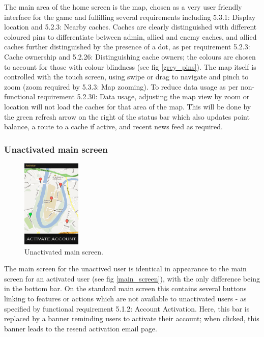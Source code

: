 The main area of the home screen is the map, chosen as a very user friendly interface for the game and fulfilling several requirements including 5.3.1: Display location and 5.2.3: Nearby caches. Caches are clearly distinguished with different coloured pins to differentiate between admin, allied and enemy caches, and allied caches further distinguished by the presence of a dot, as per requirement 5.2.3: Cache ownership and 5.2.26: Distinguishing cache owners; the colours are chosen to account for those with colour blindness (see fig \ref{grey_pins}). The map itself is controlled with the touch screen, using swipe or drag to navigate and pinch to zoom (zoom required by 5.3.3: Map zooming). To reduce data usage as per non-functional requirement 5.2.30: Data usage, adjusting the map view by zoom or location will not load the caches for that area of the map. This will be done by the green refresh arrow on the right of the status bar which also updates point balance, a route to a cache if active, and recent news feed as required.

\subsubsection{Unactivated main screen}

\begin{figure}
	\vspace{-80pt}
	\begin{center}
	\includegraphics[width=0.25\textwidth]{images/unauthorised_main_mockup}
	\caption{Unactivated main screen.}
	\label{unactivated_main}
	\end{center}
	\vspace{-20pt}
\end{figure}

The main screen for the unactived user is identical in appearance to the main screen for an activated user (see fig \ref{main_screen}), with the only difference being in the bottom bar. On the standard main screen this contains several buttons linking to features or actions which are not available to unactivated users - as specified by functional requirement 5.1.2: Account Activation. Here, this bar is replaced by a banner reminding users to activate their account; when clicked, this banner leads to the resend activation email page.

